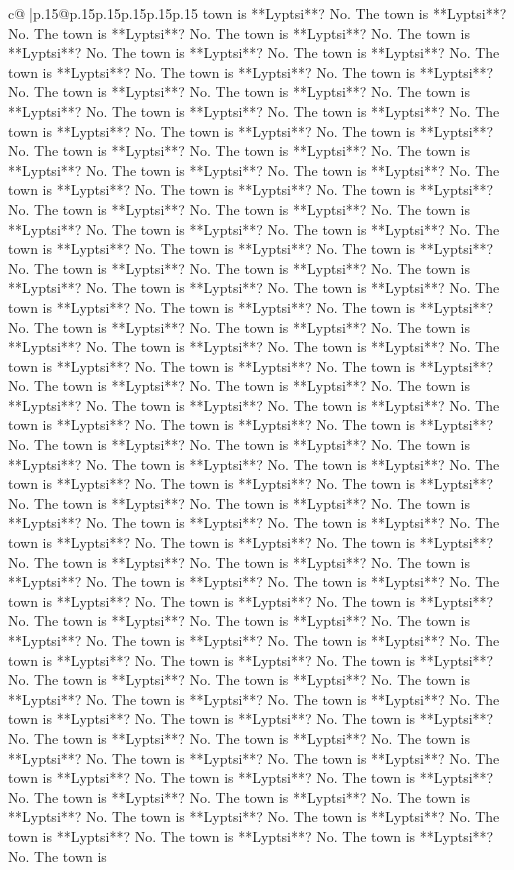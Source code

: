 \documentclass{article}
\begin{document}
{\begin{supertabular}{c@{$\;$}|p{.15\linewidth}@{}p{.15\linewidth}p{.15\linewidth}p{.15\linewidth}p{.15\linewidth}p{.15\linewidth}}
{{{town is **Lyptsi**? No. The town is **Lyptsi**? No. The town is **Lyptsi**? No. The town is **Lyptsi**? No. The town is **Lyptsi**? No. The town is **Lyptsi**? No. The town is **Lyptsi**? No. The town is **Lyptsi**? No. The town is **Lyptsi**? No. The town is **Lyptsi**? No. The town is **Lyptsi**? No. The town is **Lyptsi**? No. The town is **Lyptsi**? No. The town is **Lyptsi**? No. The town is **Lyptsi**? No. The town is **Lyptsi**? No. The town is **Lyptsi**? No. The town is **Lyptsi**? No. The town is **Lyptsi**? No. The town is **Lyptsi**? No. The town is **Lyptsi**? No. The town is **Lyptsi**? No. The town is **Lyptsi**? No. The town is **Lyptsi**? No. The town is **Lyptsi**? No. The town is **Lyptsi**? No. The town is **Lyptsi**? No. The town is **Lyptsi**? No. The town is **Lyptsi**? No. The town is **Lyptsi**? No. The town is **Lyptsi**? No. The town is **Lyptsi**? No. The town is **Lyptsi**? No. The town is **Lyptsi**? No. The town is **Lyptsi**? No. The town is **Lyptsi**? No. The town is **Lyptsi**? No. The town is **Lyptsi**? No. The town is **Lyptsi**? No. The town is **Lyptsi**? No. The town is **Lyptsi**? No. The town is **Lyptsi**? No. The town is **Lyptsi**? No. The town is **Lyptsi**? No. The town is **Lyptsi**? No. The town is **Lyptsi**? No. The town is **Lyptsi**? No. The town is **Lyptsi**? No. The town is **Lyptsi**? No. The town is **Lyptsi**? No. The town is **Lyptsi**? No. The town is **Lyptsi**? No. The town is **Lyptsi**? No. The town is **Lyptsi**? No. The town is **Lyptsi**? No. The town is **Lyptsi**? No. The town is **Lyptsi**? No. The town is **Lyptsi**? No. The town is **Lyptsi**? No. The town is **Lyptsi**? No. The town is **Lyptsi**? No. The town is **Lyptsi**? No. The town is **Lyptsi**? No. The town is **Lyptsi**? No. The town is **Lyptsi**? No. The town is **Lyptsi**? No. The town is **Lyptsi**? No. The town is **Lyptsi**? No. The town is **Lyptsi**? No. The town is **Lyptsi**? No. The town is **Lyptsi**? No. The town is **Lyptsi**? No. The town is **Lyptsi**? No. The town is **Lyptsi**? No. The town is **Lyptsi**? No. The town is **Lyptsi**? No. The town is **Lyptsi**? No. The town is **Lyptsi**? No. The town is **Lyptsi**? No. The town is **Lyptsi**? No. The town is **Lyptsi**? No. The town is **Lyptsi**? No. The town is **Lyptsi**? No. The town is **Lyptsi**? No. The town is **Lyptsi**? No. The town is **Lyptsi**? No. The town is **Lyptsi**? No. The town is **Lyptsi**? No. The town is **Lyptsi**? No. The town is **Lyptsi**? No. The town is **Lyptsi**? No. The town is **Lyptsi**? No. The town is **Lyptsi**? No. The town is **Lyptsi**? No. The town is **Lyptsi**? No. The town is **Lyptsi**? No. The town is **Lyptsi**? No. The town is **Lyptsi**? No. The town is **Lyptsi**? No. The town is **Lyptsi**? No. The town is **Lyptsi**? No. The town is **Lyptsi**? No. The town is **Lyptsi**? No. The town is **Lyptsi**? No. The town is **Lyptsi**? No. The town is **Lyptsi**? No. The town is **Lyptsi**? No. The town is **Lyptsi**? No. The town is **Lyptsi**? No. The town is **Lyptsi**? No. The town is **Lyptsi**? No. The town is **Lyptsi**? No. The town is **Lyptsi**? No. The town is **Lyptsi**? No. The town is }}}
\end{supertabular}}
\end{document}
